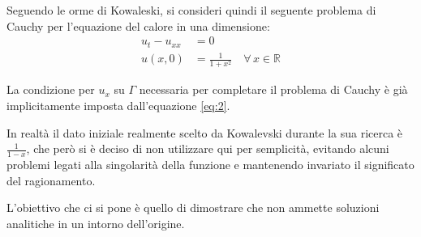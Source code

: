Seguendo le orme di Kowaleski, si consideri quindi il seguente problema di Cauchy per l'equazione del calore in una dimensione:
\begin{align}
\label{eq:1}
u_t-u_{xx}&=0\\ 
\label{eq:2}
u(x,0)&=\frac{1}{1+x^2} \quad \forall \, x \in \mathbb{R}
\end{align}
\begin{remark}
La condizione per $u_x$ su $\Gamma$ necessaria per completare il problema di Cauchy è già implicitamente imposta dall'equazione
\eqref{eq:2}.
\end{remark}
\begin{remark}
In realtà il dato iniziale realmente scelto da Kowalevski durante la sua ricerca è $\frac{1}{1-x}$, che però si è deciso di non utilizzare qui per semplicità, evitando alcuni problemi legati alla singolarità della funzione e mantenendo invariato il significato del ragionamento.
\end{remark}
L'obiettivo che ci si pone è quello di dimostrare che non ammette soluzioni analitiche in un intorno dell'origine.

